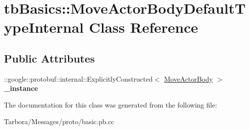 \hypertarget{classtbBasics_1_1MoveActorBodyDefaultTypeInternal}{}\section{tb\+Basics\+:\+:Move\+Actor\+Body\+Default\+Type\+Internal Class Reference}
\label{classtbBasics_1_1MoveActorBodyDefaultTypeInternal}
\subsection*{Public Attributes}
\begin{DoxyCompactItemize}
\item 
\mbox{\label{classtbBasics_1_1MoveActorBodyDefaultTypeInternal_a46aad0047e448a0c8ed0442861e2fa8a}} 
\+::google\+::protobuf\+::internal\+::\+Explicitly\+Constructed$<$ \hyperlink{classtbBasics_1_1MoveActorBody}{Move\+Actor\+Body} $>$ {\bfseries \+\_\+instance}
\end{DoxyCompactItemize}


The documentation for this class was generated from the following file\+:\begin{DoxyCompactItemize}
\item 
Tarbora/\+Messages/proto/basic.\+pb.\+cc\end{DoxyCompactItemize}
